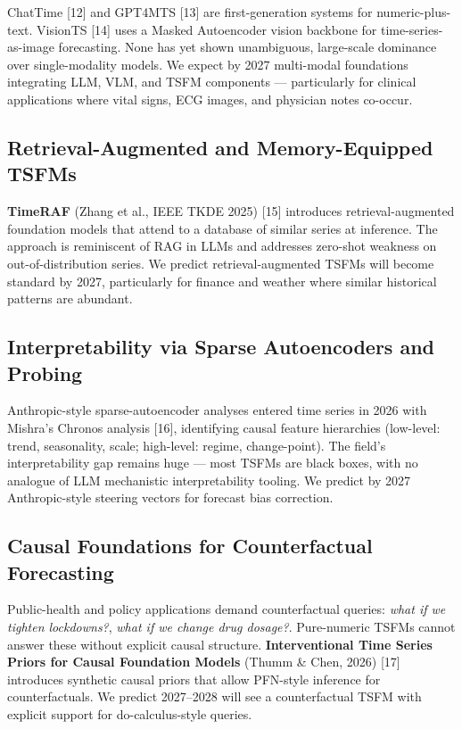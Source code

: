 ChatTime {[}12{]} and GPT4MTS {[}13{]} are first-generation systems for numeric-plus-text. VisionTS {[}14{]} uses a Masked Autoencoder vision backbone for time-series-as-image forecasting. None has yet shown unambiguous, large-scale dominance over single-modality models. We expect by 2027 multi-modal foundations integrating LLM, VLM, and TSFM components --- particularly for clinical applications where vital signs, ECG images, and physician notes co-occur.

\subsection{Retrieval-Augmented and Memory-Equipped TSFMs}\label{retrieval-augmented-and-memory-equipped-tsfms}

\textbf{TimeRAF} (Zhang et al., IEEE TKDE 2025) {[}15{]} introduces retrieval-augmented foundation models that attend to a database of similar series at inference. The approach is reminiscent of RAG in LLMs and addresses zero-shot weakness on out-of-distribution series. We predict retrieval-augmented TSFMs will become standard by 2027, particularly for finance and weather where similar historical patterns are abundant.

\subsection{Interpretability via Sparse Autoencoders and Probing}\label{interpretability-via-sparse-autoencoders-and-probing}

Anthropic-style sparse-autoencoder analyses entered time series in 2026 with Mishra's Chronos analysis {[}16{]}, identifying causal feature hierarchies (low-level: trend, seasonality, scale; high-level: regime, change-point). The field's interpretability gap remains huge --- most TSFMs are black boxes, with no analogue of LLM mechanistic interpretability tooling. We predict by 2027 Anthropic-style steering vectors for forecast bias correction.

\subsection{Causal Foundations for Counterfactual Forecasting}\label{causal-foundations-for-counterfactual-forecasting}

Public-health and policy applications demand counterfactual queries: \emph{what if we tighten lockdowns?}, \emph{what if we change drug dosage?}. Pure-numeric TSFMs cannot answer these without explicit causal structure. \textbf{Interventional Time Series Priors for Causal Foundation Models} (Thumm \& Chen, 2026) {[}17{]} introduces synthetic causal priors that allow PFN-style inference for counterfactuals. We predict 2027--2028 will see a counterfactual TSFM with explicit support for do-calculus-style queries.

